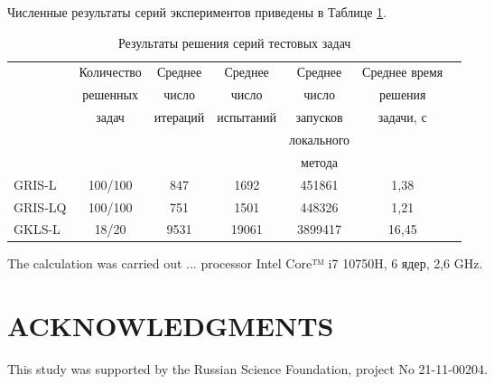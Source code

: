 \documentclass{aip-cp}
\begin{document}
Численные результаты серий экспериментов приведены в Таблице \ref{tab1}.

\begin{table}[ht]
	\caption{Результаты решения серий тестовых задач}
	\label{tab1}
		\begin{tabular}{ l c c c c c c } \hline
		 & Количество &  Среднее & Среднее & Среднее & Среднее время \\ 
		 & решенных  & число & число & число  & решения \\ 
		 & задач & итераций & испытаний & запусков & задачи, с\\
		 &  & & & локального & \\
		 & & & & метода & \\ \hline
		GRIS-L & 100/100  & 847 & 1692 & 451861 & 1,38 \\
		GRIS-LQ & 100/100 & 751 & 1501 & 448326 & 1,21 \\
		GKLS-L & 18/20 & 9531 & 19061 & 3899417 & 16,45 \\
		\hline
		\end{tabular}
\end{table}


The calculation was carried out ... processor Intel Core™ i7 10750H, 6 ядер, 2,6 GHz.

\section{ACKNOWLEDGMENTS}
This study was supported by the Russian Science Foundation, project No 21-11-00204.




%
%
\end{document}
